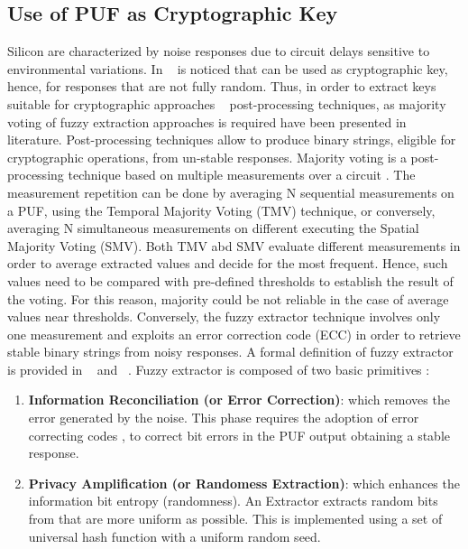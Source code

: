 \documentclass[../tesi.tex]{subfiles}
\begin{document}
\subsection{Use of PUF as Cryptographic Key} \label{fuzzyextractor}
Silicon \puf{} are characterized by noise responses due to circuit delays sensitive to environmental variations. In ~\cite{tuyls2006read} is noticed that \puf{} can be used as cryptographic key, hence, for \puf{} responses that are not fully random. Thus, in order to extract keys suitable for cryptographic approaches ~\cite{bosch2008efficient} post-processing techniques, as majority voting of fuzzy extraction approaches is required have been presented in literature.
Post-processing techniques allow to produce binary strings, eligible for cryptographic operations, from un-stable \puf{} responses. Majority voting is a post-processing technique based on multiple measurements over a \puf{} circuit \cite{maes2010intrinsic}. The measurement repetition can be done by averaging N sequential measurements on a PUF, using the Temporal Majority Voting (TMV) technique, or conversely, averaging N simultaneous measurements on different  executing the Spatial Majority Voting (SMV).
Both TMV abd SMV evaluate different measurements in order to average extracted values and decide for the most frequent. Hence, such values need to be compared with pre-defined thresholds to establish the result of the voting. For this reason, majority could be not reliable in the case of average values near thresholds. 
Conversely, the fuzzy extractor technique involves only one measurement and exploits an error correction code (ECC) in order to retrieve stable binary strings from noisy responses.
A formal definition of fuzzy extractor is provided in ~\cite{dodis2004fuzzy} and ~\cite{linnartz2003new}. %
Fuzzy extractor is composed of two basic primitives :
\begin{enumerate}
\item \textbf{Information Reconciliation (or Error Correction)}: which removes the error generated by the noise. This phase requires the adoption of error correcting codes %
 \cite{gardner2009detecting} \cite{li2011viper} \cite{seshadri2005pioneer}, to correct bit errors in the PUF output obtaining a stable response.
\item \textbf{Privacy Amplification (or Randomess Extraction)}: which enhances the information bit entropy (randomness). An Extractor extracts random bits from \puf{} that are more uniform as possible. This is implemented using a set of universal hash function with a uniform random seed.
\end{enumerate}
\end{document}
